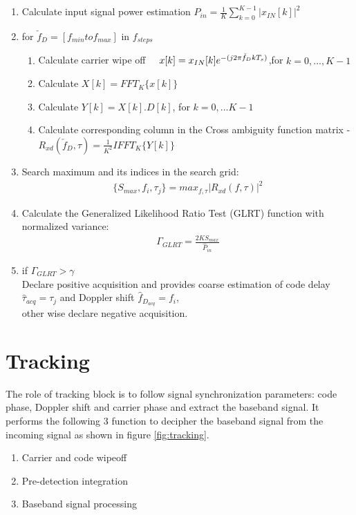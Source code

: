 \begin{enumerate}
	\item Calculate input signal power estimation  $\hat P_{in} = \frac{1}{K}\sum_{k=0}^{K-1} \big| x_{IN}[k]\big| ^2$
	\item for $\check f_D=[ f_{min} to f_{max}]\text{ in }f_{steps}$ 
	\begin{enumerate}
		\item Calculate carrier wipe off$\hspace{0.5cm}x[k]=x_{IN}[k]e^{-(j2 \pi \check f_D k T_s)}$,for $k=0,...,K-1$
		\item Calculate $X[k]=FFT_K\{x[k]\}$
		\item Calculate $Y[k]=X[k].D[k]$, for $k=0,...K-1$ 
        	\item Calculate corresponding column in the Cross ambiguity function matrix - $R_{xd}(\check f_D,\tau) = \frac{1}{K^2}IFFT_K\{Y[k]\}$
        \end{enumerate}

        \item Search maximum and its indices in the search grid:
	\begin{align}
		\{S_{max},f_i,\tau_j\} = max_{f,\tau} \big |R_{xd}(f,\tau)\big | ^2
	\end{align}
        \item	Calculate the Generalized Likelihood Ratio Test (GLRT) function with normalized variance:
	\begin{align}
		\Gamma_{GLRT} = \frac{2KS_{max}}{\hat P_{in}}
	\end{align}
	\item if $\Gamma_{GLRT} > \gamma$\\
	Declare positive acquisition and provides coarse estimation of code delay $\hat \tau_{acq} = \tau_j $ and Doppler shift $\hat f_{D_{acq}}=f_i$,\\
	other wise declare negative acquisition.\\
\end{enumerate}


\section{Tracking}
The role of tracking block is to follow signal synchronization parameters: code phase, Doppler shift and carrier phase and extract the baseband signal. It performs the following 3 function to decipher the baseband signal from the incoming signal as shown in figure \ref{fig:tracking}. 
\begin{enumerate}
	\item Carrier and code wipeoff 
	\item Pre-detection integration
	\item Baseband signal processing
\end{enumerate}

